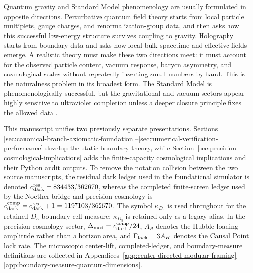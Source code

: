 \documentclass[11pt]{article}
\newcommand{\cdarkres}{c_{\rm dark}^{\rm res}}
\newcommand{\cdarkcomp}{c_{\rm dark}^{\rm comp}}
\newcommand{\DeltaMod}{\Delta_{\rm mod}}
\newcommand{\GammaLock}{\Gamma_{\rm lock}}
\newcommand{\AH}{A_H}
\newcommand{\kappad}{\kappa_{D_5}}
\newcommand{\kappaD}{\kappad}
\begin{document}
Quantum gravity and Standard Model phenomenology are usually formulated in
opposite directions.  Perturbative quantum field theory starts from local
particle multiplets, gauge charges, and renormalization-group data, and then
asks how this successful low-energy structure survives coupling to gravity.
Holography starts from boundary data and asks how local bulk spacetime and
effective fields emerge.  A realistic theory must make these two directions
meet: it must account for the observed particle content, vacuum response,
baryon asymmetry, and cosmological scales without repeatedly inserting small
numbers by hand.  This is the naturalness problem in its broadest form.  The
Standard Model is phenomenologically successful, but the gravitational and
vacuum sectors appear highly sensitive to ultraviolet completion unless a
deeper closure principle fixes the allowed data
\cite{thooft1980,weinberg1989,pdg2024}.

This manuscript unifies two previously separate presentations.  Sections
\ref{sec:canonical-branch-axiomatic-foundation}--\ref{sec:numerical-verification-performance}
develop the static boundary theory, while
Section~\ref{sec:precision-cosmological-implications} adds the finite-capacity
cosmological implications and their Python audit outputs.  To remove the
notation collision between the two source manuscripts, the residual dark ledger
used in the foundational simulator is denoted
\(\cdarkres=834433/362670\), whereas the completed finite-screen ledger used by
the Noether bridge and precision cosmology is
\(\cdarkcomp=\cdarkres+1=1197103/362670\).  The symbol
\(\kappad\) is used throughout for the retained \(D_5\) boundary-cell measure;
\(\kappaD\) is retained only as a legacy alias.  In the precision-cosmology
sector, \(\DeltaMod=\cdarkcomp/24\), \(\AH\) denotes the Hubble-loading
amplitude rather than a horizon area, and \(\GammaLock=3\AH\) denotes the
Causal Point lock rate.  The microscopic center-lift, completed-ledger, and
boundary-measure definitions are collected in
Appendices~\ref{app:center-directed-modular-framing}--\ref{app:boundary-measure-quantum-dimensions}.
\end{document}
